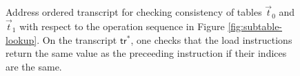 \begin{figure}[htbp]
{\begin{tikzpicture}
        \end{tikzpicture}
            }
            \caption{Address ordered transcript for checking consistency of tables $\vec{t}_0$ and $\vec{t}_1$
                with respect to the operation sequence in Figure \ref{fig:subtable-lookup}. On the transcript
            $\mathsf{tr}^\ast$, one checks that the load instructions return the same value as the preceeding
            instruction if their indices are the same.}

        \label{fig:subtable-consistency}
    \end{figure}
